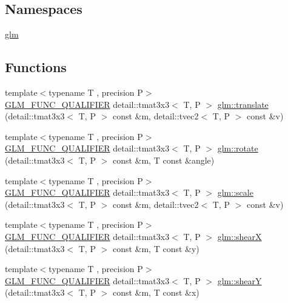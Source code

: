 \subsection*{Namespaces}
\begin{DoxyCompactItemize}
\item 
 \hyperlink{namespaceglm}{glm}
\end{DoxyCompactItemize}
\subsection*{Functions}
\begin{DoxyCompactItemize}
\item 
{\footnotesize template$<$typename T , precision P$>$ }\\\hyperlink{setup_8hpp_a33fdea6f91c5f834105f7415e2a64407}{G\+L\+M\+\_\+\+F\+U\+N\+C\+\_\+\+Q\+U\+A\+L\+I\+F\+I\+ER} detail\+::tmat3x3$<$ T, P $>$ \hyperlink{group__gtx__matrix__transform__2d_gaa73c0e940e66b4e8aebf9dc72f5a7e34}{glm\+::translate} (detail\+::tmat3x3$<$ T, P $>$ const \&m, detail\+::tvec2$<$ T, P $>$ const \&v)
\item 
{\footnotesize template$<$typename T , precision P$>$ }\\\hyperlink{setup_8hpp_a33fdea6f91c5f834105f7415e2a64407}{G\+L\+M\+\_\+\+F\+U\+N\+C\+\_\+\+Q\+U\+A\+L\+I\+F\+I\+ER} detail\+::tmat3x3$<$ T, P $>$ \hyperlink{group__gtx__matrix__transform__2d_gae172cd1e33a5c7b82c69a9731eac6c67}{glm\+::rotate} (detail\+::tmat3x3$<$ T, P $>$ const \&m, T const \&angle)
\item 
{\footnotesize template$<$typename T , precision P$>$ }\\\hyperlink{setup_8hpp_a33fdea6f91c5f834105f7415e2a64407}{G\+L\+M\+\_\+\+F\+U\+N\+C\+\_\+\+Q\+U\+A\+L\+I\+F\+I\+ER} detail\+::tmat3x3$<$ T, P $>$ \hyperlink{group__gtx__matrix__transform__2d_gaf17588e16120250980b221c2ebdde0eb}{glm\+::scale} (detail\+::tmat3x3$<$ T, P $>$ const \&m, detail\+::tvec2$<$ T, P $>$ const \&v)
\item 
{\footnotesize template$<$typename T , precision P$>$ }\\\hyperlink{setup_8hpp_a33fdea6f91c5f834105f7415e2a64407}{G\+L\+M\+\_\+\+F\+U\+N\+C\+\_\+\+Q\+U\+A\+L\+I\+F\+I\+ER} detail\+::tmat3x3$<$ T, P $>$ \hyperlink{group__gtx__matrix__transform__2d_gaeac73f42bba3e35100d9a43c40dc0f23}{glm\+::shearX} (detail\+::tmat3x3$<$ T, P $>$ const \&m, T const \&y)
\item 
{\footnotesize template$<$typename T , precision P$>$ }\\\hyperlink{setup_8hpp_a33fdea6f91c5f834105f7415e2a64407}{G\+L\+M\+\_\+\+F\+U\+N\+C\+\_\+\+Q\+U\+A\+L\+I\+F\+I\+ER} detail\+::tmat3x3$<$ T, P $>$ \hyperlink{group__gtx__matrix__transform__2d_ga04dd04815c1c8ee0bd49e6ae499d8252}{glm\+::shearY} (detail\+::tmat3x3$<$ T, P $>$ const \&m, T const \&x)
\end{DoxyCompactItemize}
